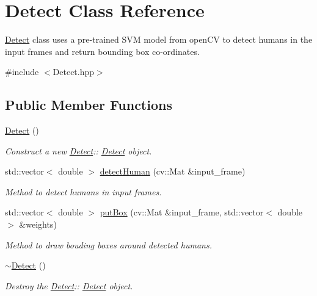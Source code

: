 \hypertarget{classDetect}{}\section{Detect Class Reference}
\label{classDetect}


\hyperlink{classDetect}{Detect} class uses a pre-\/trained S\+VM model from open\+CV to detect humans in the input frames and return bounding box co-\/ordinates.  




{\ttfamily \#include $<$Detect.\+hpp$>$}

\subsection*{Public Member Functions}
\begin{DoxyCompactItemize}
\item 
\mbox{\label{classDetect_afefa427dddf8e308f93fd49424cc3680}} 
\hyperlink{classDetect_afefa427dddf8e308f93fd49424cc3680}{Detect} ()
\begin{DoxyCompactList}\small\item\em Construct a new \hyperlink{classDetect}{Detect}\+:\+: \hyperlink{classDetect}{Detect} object. \end{DoxyCompactList}\item 
std\+::vector$<$ double $>$ \hyperlink{classDetect_a7a27975d3aeb0ef43042106554fccb07}{detect\+Human} (cv\+::\+Mat \&input\+\_\+frame)
\begin{DoxyCompactList}\small\item\em Method to detect humans in input frames. \end{DoxyCompactList}\item 
std\+::vector$<$ double $>$ \hyperlink{classDetect_a67c037bd61725af5ec53beadcb4f58d0}{put\+Box} (cv\+::\+Mat \&input\+\_\+frame, std\+::vector$<$ double $>$ \&weights)
\begin{DoxyCompactList}\small\item\em Method to draw bouding boxes around detected humans. \end{DoxyCompactList}\item 
\mbox{\label{classDetect_aa808b1146b9b8db316b25b02f0a6b5f3}} 
\hyperlink{classDetect_aa808b1146b9b8db316b25b02f0a6b5f3}{$\sim$\+Detect} ()
\begin{DoxyCompactList}\small\item\em Destroy the \hyperlink{classDetect}{Detect}\+:\+: \hyperlink{classDetect}{Detect} object. \end{DoxyCompactList}\end{DoxyCompactItemize}
